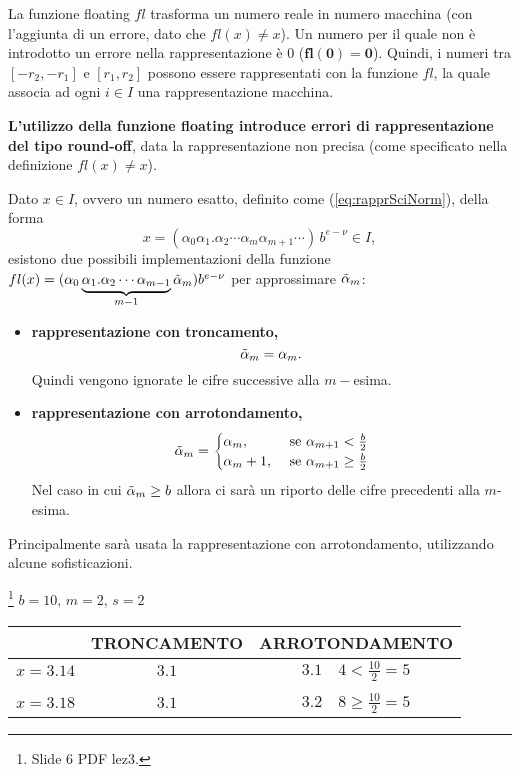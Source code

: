 La funzione floating $fl$ trasforma un numero reale in numero macchina (con l'aggiunta di un errore, dato che $fl(x)\neq x$). Un numero per il quale non è introdotto un errore nella rappresentazione è 0 ($\boldsymbol{fl(0)=0}$). Quindi, i numeri tra $[-r_2,-r_1]$ e $[r_1,r_2]$ possono essere rappresentati con la funzione $fl$, la quale associa ad ogni $i\in I$ una rappresentazione macchina. 

\textbf{L'utilizzo della funzione floating introduce errori di rappresentazione del tipo round-off}, data la rappresentazione non precisa (come specificato nella definizione $fl(x)\neq x$).

Dato $x\in I$, ovvero un numero esatto, definito come (\ref{eq:rapprSciNorm}), della forma 
\begin{equation}\label{eq:numEsatto}
    x=(\alpha_0\alpha_1.\alpha_2\cdots\alpha_m\alpha_{m+1}\cdots)\,b^{e-\nu}\in I,
\end{equation}
esistono due possibili implementazioni della funzione $fl(x)=(\alpha_0\underbrace{\alpha_1.\alpha_2\cdots\alpha_{m-1}}_{m-1}\Tilde{\alpha}_m)b^{e-\nu}$ per approssimare $\Tilde{\alpha}_m$:
\begin{itemize}
    \item \textbf{rappresentazione con troncamento,} \begin{equation}\label{eq:troncamento}
        \Tilde{\alpha}_m=\alpha_m.
    \end{equation}
    Quindi vengono ignorate le cifre successive alla $m-$esima.
    \item \textbf{rappresentazione con arrotondamento,}
    \begin{align}
        \Tilde{\alpha}_m=
        \begin{cases}
            \alpha_m, &\text{ se }\alpha_{m+1}<\frac{b}{2}\\
            \alpha_m+1, &\text{ se }\alpha_{m+1}\geq\frac{b}{2}
        \end{cases}
    \end{align}
    Nel caso in cui $\Tilde{\alpha}_m\geq b$ allora ci sarà un riporto delle cifre precedenti alla $m$-esima.
\end{itemize}
Principalmente sarà usata la rappresentazione con arrotondamento, utilizzando alcune sofisticazioni.

\begin{example}\footnote{Slide 6 PDF lez3.}
    $b=10,\, m=2,\, s=2$
    \begin{center}
        \begin{tabular}{c|cc}
        & TRONCAMENTO & ARROTONDAMENTO\\
        \hline
        $x=3.14$ & $3.1$ & $3.1\quad 4<\frac{10}{2}=5$\\\\
        $x=3.18$ & $3.1$ & $3.2 \quad 8 \geq \frac{10}{2}=5$
        \end{tabular}
    \end{center}
\end{example}

